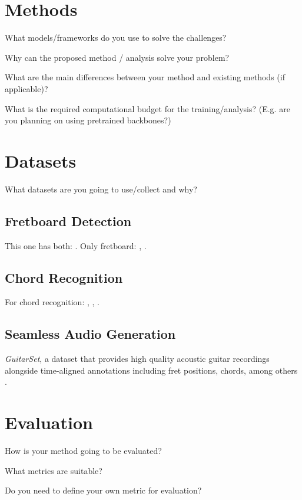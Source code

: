 \documentclass[10pt,twocolumn,letterpaper]{article}
\begin{document}
\section{Methods}

What models/frameworks do you use to solve the challenges?

Why can the proposed method / analysis solve your problem?

What are the main differences between your method and existing methods (if applicable)?

What is the required computational budget for the training/analysis? (E.g. are you planning on using pretrained backbones?)

\section{Datasets}

What datasets are you going to use/collect and why?


\subsection{Fretboard Detection}
This one has both: \cite{guitar-chords-daewp_dataset}. 
Only fretboard: \cite{guitar-ppfil_dataset}, \cite{done-npcll_dataset}.

\subsection{Chord Recognition}
For chord recognition: \cite{guitar-chord-tvon8_dataset}, \cite{guitar-chord-bounding-box_dataset}, \cite{guitar-chord-handshape_dataset}.

\subsection{Seamless Audio Generation}
\emph{GuitarSet}, a dataset that provides high quality acoustic guitar recordings alongside time-aligned annotations including fret positions, chords, among others \cite{Xi2018}.

\section{Evaluation}

How is your method going to be evaluated?

What metrics are suitable?

Do you need to define your own metric for evaluation?

\clearpage 

{\small


}
\end{document}
